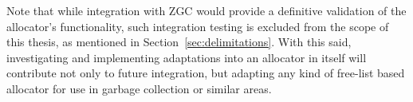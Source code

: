 Note that while integration with ZGC would provide a definitive validation of the allocator's functionality, such integration testing is excluded from the scope of this thesis, as mentioned in Section~\ref{sec:delimitations}. With this said, investigating and implementing adaptations into an allocator in itself will contribute not only to future integration, but adapting any kind of free-list based allocator for use in garbage collection or similar areas.

